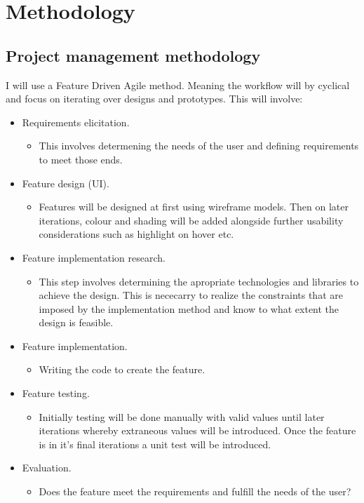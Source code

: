 \chapter{Methodology}
\label{methodology}

\section{Project management methodology}
I will use a Feature Driven Agile method. Meaning the workflow will by cyclical and focus on iterating over designs and prototypes. This will involve:
\begin{itemize}
  \item Requirements elicitation.
  \begin{itemize}
    \item This involves determening the needs of the user and defining requirements to meet those ends.
  \end{itemize}
  \item Feature design (UI).
  \begin{itemize}
    \item Features will be designed at first using wireframe models. Then on later iterations, colour and shading will be added alongside further usability considerations such as highlight on hover etc.
  \end{itemize}
  \item Feature implementation research.
  \begin{itemize}
    \item This step involves determining the apropriate technologies and libraries to achieve the design. This is nececarry to realize the constraints that are imposed by the implementation method and know to what extent the design is feasible.
  \end{itemize}
  \item Feature implementation.
  \begin{itemize}
    \item Writing the code to create the feature.
  \end{itemize}
  \item Feature testing.
  \begin{itemize}
    \item Initially testing will be done manually with valid values until later iterations whereby extraneous values will be introduced. Once the feature is in it's final iterations a unit test will be introduced.
  \end{itemize}
  \item Evaluation.
  \begin{itemize}
    \item Does the feature meet the requirements and fulfill the needs of the user?
  \end{itemize}
\end{itemize}
